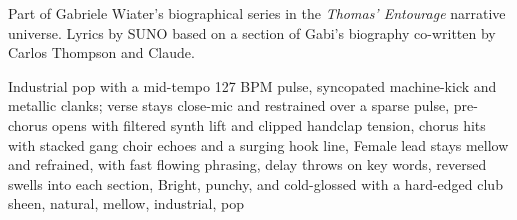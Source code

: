 
\begin{notes}
Part of Gabriele Wiater's biographical series in the \emph{Thomas’ Entourage} narrative universe. Lyrics by SUNO based on a section of Gabi's biography co-written by Carlos Thompson and Claude.
\end{notes}
\begin{style}
Industrial pop with a mid-tempo 127 BPM pulse, syncopated machine-kick and metallic clanks; verse stays close-mic and restrained over a sparse pulse, pre-chorus opens with filtered synth lift and clipped handclap tension, chorus hits with stacked gang choir echoes and a surging hook line, Female lead stays mellow and refrained, with fast flowing phrasing, delay throws on key words, reversed swells into each section, Bright, punchy, and cold-glossed with a hard-edged club sheen, natural, mellow, industrial, pop
\end{style}

